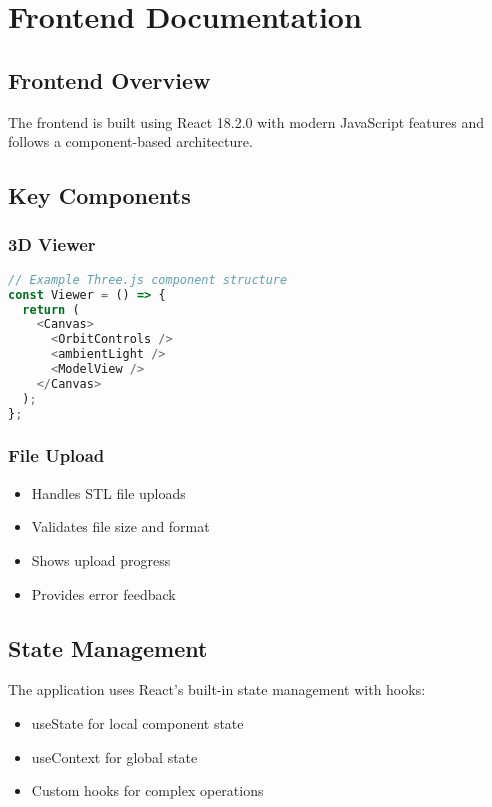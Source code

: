 \chapter{Frontend Documentation}

\section{Frontend Overview}
The frontend is built using React 18.2.0 with modern JavaScript features and follows a component-based architecture.

\section{Key Components}
\subsection{3D Viewer}
\begin{lstlisting}[language=JavaScript]
// Example Three.js component structure
const Viewer = () => {
  return (
    <Canvas>
      <OrbitControls />
      <ambientLight />
      <ModelView />
    </Canvas>
  );
};
\end{lstlisting}

\subsection{File Upload}
\begin{itemize}
    \item Handles STL file uploads
    \item Validates file size and format
    \item Shows upload progress
    \item Provides error feedback
\end{itemize}

\section{State Management}
The application uses React's built-in state management with hooks:
\begin{itemize}
    \item useState for local component state
    \item useContext for global state
    \item Custom hooks for complex operations
\end{itemize}

